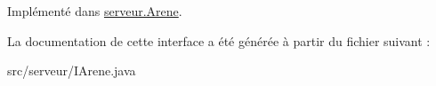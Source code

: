 Implémenté dans \hyperlink{classserveur_1_1_arene_a1b8ef284b2fae162ba68884bfbe0160a}{serveur.\-Arene}.



La documentation de cette interface a été générée à partir du fichier suivant \-:\begin{DoxyCompactItemize}
\item 
src/serveur/I\-Arene.\-java\end{DoxyCompactItemize}
